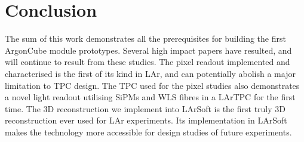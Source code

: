 \chapter{Conclusion\label{chap:conclusion}}
The sum of this work demonstrates all the prerequisites for building the first ArgonCube module prototypes.
Several high impact papers have resulted, and will continue to result from these studies.
The pixel readout implemented and characterised is the first of its kind in LAr, and can potentially abolish a major limitation to TPC design.
The TPC used for the pixel studies also demonstrates a novel light readout utilising SiPMs and WLS fibres in a LArTPC for the first time.
The 3D reconstruction we implement into LArSoft is the first truly 3D reconstruction ever used for LAr experiments.
Its implementation in LArSoft makes the technology more accessible for design studies of future experiments.
